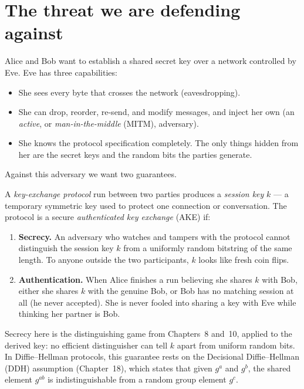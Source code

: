 \section{The threat we are defending against}

Alice and Bob want to establish a shared secret key over a network controlled
by Eve. Eve has three capabilities:

\begin{itemize}
  \item She sees every byte that crosses the network (eavesdropping).
  \item She can drop, reorder, re-send, and modify messages, and inject her own
        (an \emph{active}, or \emph{man-in-the-middle} (MITM), adversary).
  \item She knows the protocol specification completely. The only things hidden
        from her are the secret keys and the random bits the parties generate.
\end{itemize}

Against this adversary we want two guarantees.

\begin{definition}
\label{ch23:ake-goals}
A \emph{key-exchange protocol} run between two parties produces a \emph{session
key} $k$ --- a temporary symmetric key used to protect one connection or
conversation. The protocol is a secure \emph{authenticated key exchange} (AKE)
if:
\begin{enumerate}
  \item \textbf{Secrecy.} An adversary who watches and tampers with the
        protocol cannot distinguish the session key $k$ from a uniformly random
        bitstring of the same length. To anyone outside the two participants,
        $k$ looks like fresh coin flips.
  \item \textbf{Authentication.} When Alice finishes a run believing she shares
        $k$ with Bob, either she shares $k$ with the genuine Bob, or Bob has no
        matching session at all (he never accepted). She is never fooled into
        sharing a key with Eve while thinking her partner is Bob.
\end{enumerate}
\end{definition}

Secrecy here is the distinguishing game from Chapters~8 and~10, applied to the
derived key: no efficient distinguisher can tell $k$ apart from uniform random
bits. In Diffie--Hellman protocols, this guarantee rests on the Decisional
Diffie--Hellman (DDH) assumption (Chapter~18), which states that given $g^a$ and
$g^b$, the shared element $g^{ab}$ is indistinguishable from a random group
element $g^c$.

